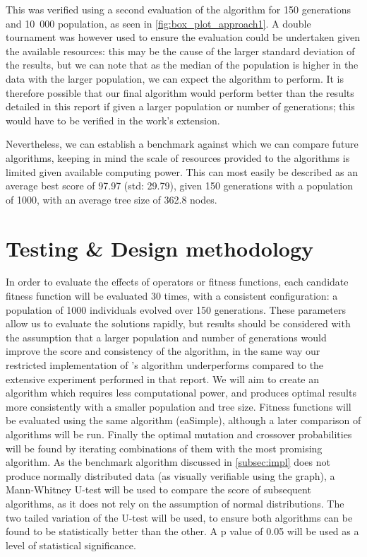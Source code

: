\documentclass[british,10pt,a4paper]{article}
\begin{document}
This was verified using a second evaluation of the algorithm for 150 generations and 10\, 000 population, as seen in \autoref{fig:box_plot_approach1}. A double tournament was however used to ensure the evaluation could be undertaken given the available resources: this may be the cause of the larger standard deviation of the results, but we can note that as the median of the population is higher in the data with the larger population, we can expect the algorithm to perform. It is therefore possible that our final algorithm would perform better than the results detailed in this report if given a larger population or number of generations; this would have to be verified in the work's extension.\newline 

Nevertheless, we can establish a benchmark against which we can compare future algorithms, keeping in mind the scale of resources provided to the algorithms is limited given available computing power. This can most easily be described as an average best score of 97.97  (std: 29.79), given 150 generations with a population of 1000, with an average tree size of 362.8 nodes. \newline




\section{Testing \& Design methodology}
\label{sec:methodology}
In order to evaluate the effects of operators or fitness functions, each candidate fitness function will be evaluated 30 times, with a consistent configuration: a population of 1000 individuals evolved over 150 generations. These parameters allow us to evaluate the solutions rapidly, but results should be considered with the assumption that a larger population and number of generations would improve the score and consistency of the algorithm, in the same way our restricted implementation of \citet{Ehlis2000-sz}'s algorithm underperforms compared to the extensive experiment performed in that report. We will aim to create an algorithm which requires less computational power, and produces optimal results more consistently with a smaller population and tree size. Fitness functions will be evaluated using the same algorithm (eaSimple), although a later comparison of algorithms will be run. Finally the optimal mutation and crossover probabilities will be found by iterating combinations of them with the most promising algorithm. As the benchmark algorithm discussed in \autoref{subsec:impl} does not produce normally distributed data (as visually verifiable using the graph), a Mann-Whitney U-test will be used to compare the score of subsequent algorithms, as it does not rely on the assumption of normal distributions\cite{Timm2002-lo}.  The two tailed variation of the U-test will be used, to ensure both algorithms can be found to be statistically better than the other. A p value of 0.05 will be used as a level of statistical significance.\newline
\end{document}
